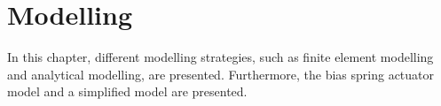 \chapter{Modelling}
In this chapter, different modelling strategies, such as finite element modelling and analytical modelling, are presented. Furthermore, the bias spring actuator model and a simplified model are presented.
